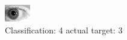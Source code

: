 \begin{figure}[h!]
\begin{center}
\includegraphics[width=0.60\columnwidth]{figures/ID181_class_4_target_3.png}
\end{center}
\caption{ Classification: 4 actual target: 3}
\label{fig:ID181_class_4_target_3}
\end{figure}
